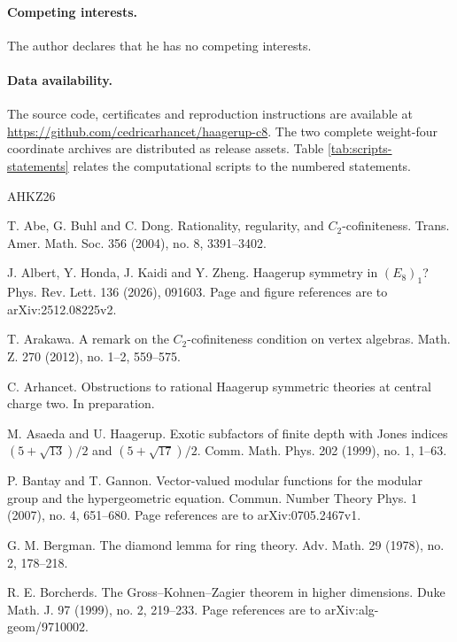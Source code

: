 \documentclass[leqno]{article}
\numberwithin{equation}{section}
\begin{document}
\paragraph{Competing interests.} The author declares that he has no competing interests.

\paragraph{Data availability.}
The source code, certificates and reproduction instructions are available at \url{https://github.com/cedricarhancet/haagerup-c8}. The two complete weight-four coordinate archives are distributed as release assets. Table \ref{tab:scripts-statements} relates the computational scripts to the numbered statements.

\begin{thebibliography}{AHKZ26}

T. Abe, G. Buhl and C. Dong.
\newblock Rationality, regularity, and $C_2$-cofiniteness.
\newblock Trans. Amer. Math. Soc. 356 (2004), no. 8, 3391--3402.

J. Albert, Y. Honda, J. Kaidi and Y. Zheng.
\newblock Haagerup symmetry in $(E_8)_1$?
\newblock Phys. Rev. Lett. 136 (2026), 091603. Page and figure references are to arXiv:2512.08225v2.

T. Arakawa.
\newblock A remark on the $C_2$-cofiniteness condition on vertex algebras.
\newblock Math. Z. 270 (2012), no. 1--2, 559--575.

C. Arhancet.
\newblock Obstructions to rational Haagerup symmetric theories at central charge two.
\newblock In preparation.

M. Asaeda and U. Haagerup.
\newblock Exotic subfactors of finite depth with Jones indices $(5+\sqrt{13})/2$ and $(5+\sqrt{17})/2$.
\newblock Comm. Math. Phys. 202 (1999), no. 1, 1--63.

P. Bantay and T. Gannon.
\newblock Vector-valued modular functions for the modular group and the hypergeometric equation.
\newblock Commun. Number Theory Phys. 1 (2007), no. 4, 651--680. Page references are to arXiv:0705.2467v1.

G. M. Bergman.
\newblock The diamond lemma for ring theory.
\newblock Adv. Math. 29 (1978), no. 2, 178--218.

R. E. Borcherds.
\newblock The Gross--Kohnen--Zagier theorem in higher dimensions.
\newblock Duke Math. J. 97 (1999), no. 2, 219--233. Page references are to arXiv:alg-geom/9710002.


\end{thebibliography}
\end{document}
